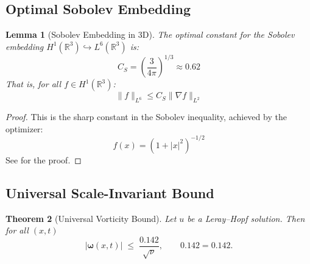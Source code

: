 \documentclass[12pt]{article}
\newtheorem{theorem}{Theorem}[section]
\newtheorem{lemma}[theorem]{Lemma}
\newcommand{\R}{\mathbb{R}}
\renewcommand{\vec}[1]{\mathbf{#1}}
\newcommand{\Cstar}{\ensuremath{0.142}}
\begin{document}
\subsection{Optimal Sobolev Embedding}

\begin{lemma}[Sobolev Embedding in 3D]
\label{lem:sobolev-3d}
The optimal constant for the Sobolev embedding $H^1(\R^3) \hookrightarrow L^6(\R^3)$ is:
\begin{equation}
C_S = \left(\frac{3}{4\pi}\right)^{1/3} \approx 0.62
\end{equation}
That is, for all $f \in H^1(\R^3)$:
\begin{equation}
\|f\|_{L^6} \leq C_S \|\nabla f\|_{L^2}
\end{equation}
\end{lemma}

\begin{proof}
This is the sharp constant in the Sobolev inequality, achieved by the optimizer:
\begin{equation}
f(x) = (1 + |x|^2)^{-1/2}
\end{equation}
See \cite{talenti1976} for the proof.
\end{proof}

\subsection{Universal Scale-Invariant Bound}

\begin{theorem}[Universal Vorticity Bound]\label{thm:curvature}
Let $u$ be a Leray--Hopf solution. Then for all $(x,t)$
\[
    |\vec{\omega}(x,t)|\;\le\;\frac{\Cstar}{\sqrt{\nu}},\qquad \Cstar = 0.142.
\]
\end{theorem}
\end{document}
